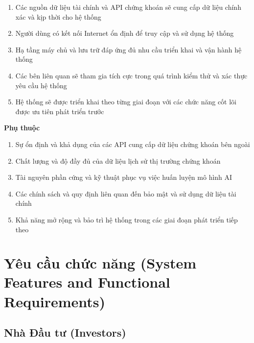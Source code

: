 \documentclass[12pt, a4paper]{article}
\begin{document}
\begin{enumerate}
    \renewcommand{\labelenumi}{\arabic{enumi})}

    \item Các nguồn dữ liệu tài chính và API chứng khoán sẽ cung cấp dữ liệu chính xác và kịp thời cho hệ thống
    \item Người dùng có kết nối Internet ổn định để truy cập và sử dụng hệ thống
    \item Hạ tầng máy chủ và lưu trữ đáp ứng đủ nhu cầu triển khai và vận hành hệ thống
    \item Các bên liên quan sẽ tham gia tích cực trong quá trình kiểm thử và xác thực yêu cầu hệ thống
    \item Hệ thống sẽ được triển khai theo từng giai đoạn với các chức năng cốt lõi được ưu tiên phát triển trước
\end{enumerate}

\noindent\textbf{Phụ thuộc}

\begin{enumerate}
    \renewcommand{\labelenumi}{\arabic{enumi})}

    \item Sự ổn định và khả dụng của các API cung cấp dữ liệu chứng khoán bên ngoài
    \item Chất lượng và độ đầy đủ của dữ liệu lịch sử thị trường chứng khoán
    \item Tài nguyên phần cứng và kỹ thuật phục vụ việc huấn luyện mô hình AI
    \item Các chính sách và quy định liên quan đến bảo mật và sử dụng dữ liệu tài chính
    \item Khả năng mở rộng và bảo trì hệ thống trong các giai đoạn phát triển tiếp theo
\end{enumerate}

\section{Yêu cầu chức năng (System Features and Functional Requirements)}

\subsection{Nhà Đầu tư (Investors)}
\end{document}
